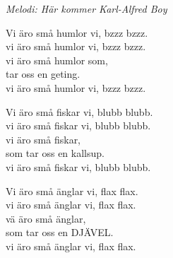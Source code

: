 {\footnotesize\textit{Melodi: Här kommer Karl-Alfred Boy}}\par
\vspace{10pt}
Vi äro små humlor vi, bzzz bzzz.\\
vi äro små humlor vi, bzzz bzzz.\\
vi äro små humlor som,\\
tar oss en geting.\\
vi äro små humlor vi, bzzz bzzz.\par
\vspace{10pt}
Vi äro små fiskar vi, blubb blubb.\\
vi äro små fiskar vi, blubb blubb.\\
vi äro små fiskar,\\
som tar oss en kallsup.\\
vi äro små fiskar vi, blubb blubb.\par
\vspace{10pt}
Vi äro små änglar vi, flax flax.\\
vi äro små änglar vi, flax flax.\\
vä äro små änglar,\\
som tar oss en DJÄVEL.\\
vi äro små änglar vi, flax flax.
